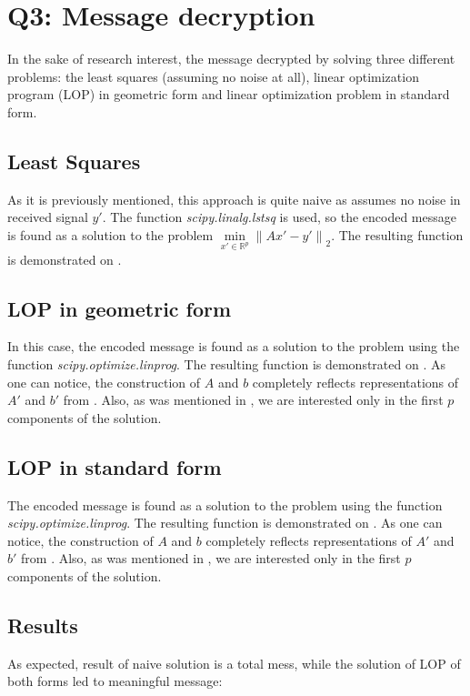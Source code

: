 \documentclass{article}
\def\R{\mathbb{R}}
\begin{document}

\section{Q3: Message decryption}

In the sake of research interest, the message decrypted by solving three different problems: the least squares (assuming no noise at all), linear optimization program (LOP) in geometric form and linear optimization problem in standard form.

\subsection{Least Squares}
As it is previously mentioned, this approach is quite naive as assumes no noise in received signal $y'$. The function \textit{scipy.linalg.lstsq} is used, so the encoded message is found as a solution to the problem $\min\limits_{x' \in \R^p} {\| Ax'-y' \|}_2$. The resulting function is demonstrated on .


\subsection{LOP in geometric form}
In this case, the encoded message is found as a solution to the problem  using the function \textit{scipy.optimize.linprog}. The resulting function is demonstrated on . As one can notice, the construction of $A$ and $b$ completely reflects representations of $A'$ and $b'$ from . Also, as was mentioned in , we are interested only in the first $p$ components of the solution.


\subsection{LOP in standard form}
The encoded message is found as a solution to the problem  using the function \textit{scipy.optimize.linprog}. The resulting function is demonstrated on . As one can notice, the construction of $A$ and $b$ completely reflects representations of $A'$ and $b'$ from .
Also, as was mentioned in , we are interested only in the first $p$ components of the solution.



\subsection{Results}
As expected, result of naive solution is a total mess, while the solution of LOP of both forms led to meaningful message:
\end{document}

